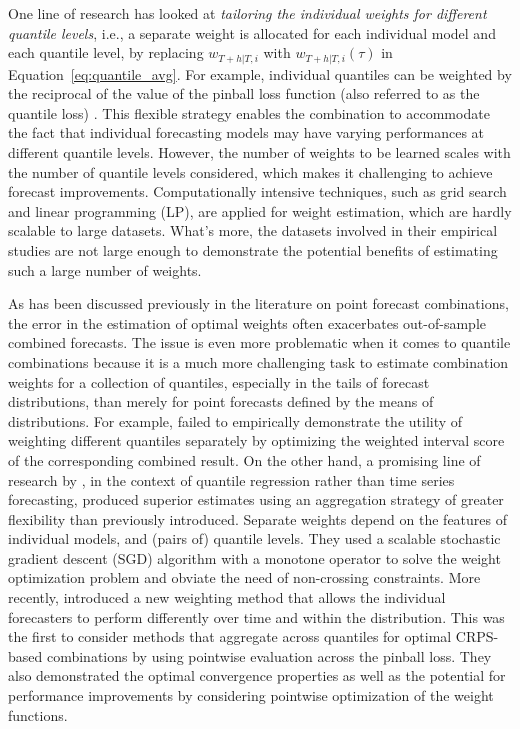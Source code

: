 \documentclass[a4paper,11pt]{article}
\begin{document}
One line of research has looked at \textit{tailoring the individual weights for different quantile levels}, i.e., a separate weight is allocated for each individual model and each quantile level, by replacing $w_{T+h|T,i}$ with $w_{T+h|T,i}(\tau)$ in Equation~\eqref{eq:quantile_avg}. For example, individual quantiles can be weighted by the reciprocal of the value of the pinball loss function (also referred to as the quantile loss) \citep{Wang2019-lx,Zhang2020-dm,Browell2020-pa}. This flexible strategy enables the combination to accommodate the fact that individual forecasting models may have varying performances at different quantile levels. However, the number of weights to be learned scales with the number of quantile levels considered, which makes it challenging to achieve forecast improvements. Computationally intensive techniques, such as grid search and linear programming (LP), are applied for weight estimation, which are hardly scalable to large datasets. What's more, the datasets involved in their empirical studies are not large enough to demonstrate the potential benefits of estimating such a large number of weights.

As has been discussed previously in the literature on point forecast combinations, the error in the estimation of optimal weights often exacerbates out-of-sample combined forecasts. The issue is even more problematic when it comes to quantile combinations because it is a much more challenging task to estimate combination weights for a collection of quantiles, especially in the tails of forecast distributions, than merely for point forecasts defined by the means of distributions. For example, \citet{Ray2022-co} failed to empirically demonstrate the utility of weighting different quantiles separately by optimizing the weighted interval score \citep[WIS,][]{Bracher2021-hx} of the corresponding combined result. On the other hand, a promising line of research by \citet{Kim2021-wa}, in the context of quantile regression rather than time series forecasting, produced superior estimates using an aggregation strategy of greater flexibility than previously introduced. Separate weights depend on the features of individual models, and (pairs of) quantile levels. They used a scalable stochastic gradient descent (SGD) algorithm with a monotone operator to solve the weight optimization problem and obviate the need of non-crossing constraints. More recently, \citet{Berrisch2021-cr} introduced a new weighting method that allows the individual forecasters to perform differently over time and within the distribution. This was the first to consider methods that aggregate across quantiles for optimal CRPS-based combinations by using pointwise evaluation across the pinball loss. They also demonstrated the optimal convergence properties as well as the potential for performance improvements by considering pointwise optimization of the weight functions.
\end{document}
